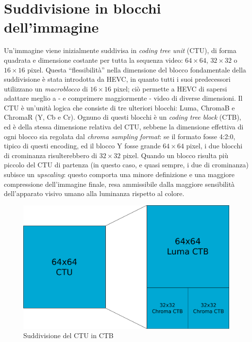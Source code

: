 \section{Suddivisione in blocchi dell'immagine} 
Un'immagine viene inizialmente suddivisa in \emph{coding tree unit} (CTU), di 
forma quadrata e dimensione costante per tutta la sequenza video: 
$64{\times}64$, $32{\times}32$ o $16{\times}16$ pixel. 
Questa ``flessibilità'' nella dimensione del blocco fondamentale 
della suddivisione è stata introdotta da HEVC, in quanto tutti i suoi 
predecessori utilizzano un \emph{macroblocco} di $16{\times}16$ pixel; 
ciò permette a HEVC di sapersi adattare meglio a - e comprimere maggiormente - 
video di diverse dimensioni.
Il CTU è un'unità logica che consiste di tre ulteriori blocchi: Luma, 
ChromaB e ChromaR (Y, Cb e Cr). Ognuno di questi blocchi è un 
\emph{coding tree block} (CTB), ed è della stessa dimensione relativa 
del CTU, sebbene la dimensione effettiva di ogni blocco sia regolata dal 
\emph{chroma sampling format}: se il formato fosse 4:2:0, tipico di questi 
encoding, ed il blocco Y fosse grande $64{\times}64$ pixel, i due blocchi di 
crominanza risulterebbero di $32{\times}32$ pixel. %
Quando un blocco risulta più piccolo del 
CTU di partenza (in questo caso, e quasi sempre, i due di crominanza) 
subisce un \emph{upscaling}: questo comporta una minore definizione e una 
maggiore compressione dell'immagine finale, resa ammissibile dalla maggiore 
sensibilità dell'apparato visivo umano alla luminanza rispetto al colore.
\begin{figure}[H]
  \centering
    \includegraphics[scale=0.35]{Figures/CTU-CTB}
  \caption{Suddivisione del CTU in CTB}
\end{figure}
